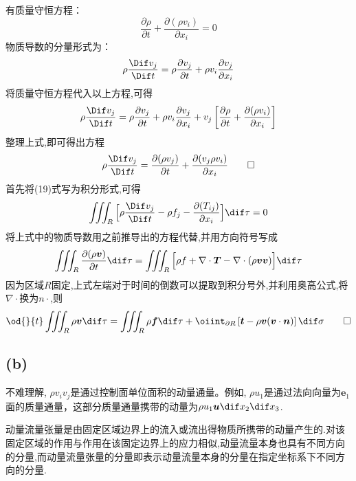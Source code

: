 \documentclass[12pt]{article}
\begin{document}
有质量守恒方程：
\begin{equation}
	\frac{\partial \rho}{\partial t} + \frac{\partial(\rho v_i)}{\partial x_i}=0
\end{equation}
物质导数的分量形式为：
\begin{equation}
	\rho\frac{\Dif  v_j}{\Dif t}=\rho\frac{\partial v_j}{\partial t} + \rho v_i\frac{\partial v_j}{\partial x_i}
\end{equation}
将质量守恒方程代入以上方程,可得
\begin{equation}
	\rho\frac{\Dif  v_j}{\Dif t}=\rho\frac{\partial v_j}{\partial t} + \rho v_i\frac{\partial v_j}{\partial x_i} + v_j \left[\frac{\partial \rho}{\partial t} + \frac{\partial(\rho v_i)}{\partial x_i}\right]
\end{equation}
整理上式,即可得出方程
\begin{equation}
	\rho\frac{\Dif  v_j}{\Dif t}=\frac{\partial(\rho v_j)}{\partial t}+\frac{\partial (v_j\rho v_i)}{\partial x_i}\qed
\end{equation}
首先将(19)式写为积分形式,可得
\begin{equation}
	\iiint_{R}\Big[\rho\frac{\Dif  v_j}{\Dif t} - \rho f_j - \frac{\partial(T_{ij})}{\partial x_i}\Big] \dif \tau = 0
\end{equation}
将上式中的物质导数用之前推导出的方程代替,并用方向符号写成
\begin{equation}
\iiint_{R} \frac{\partial (\rho \bm{v})}{\partial t} \dif \tau = \iiint_{R} \Big[\rho f + \nabla\cdot \bm{T} - \nabla\cdot(\rho \bm{v}\bm{v})\Big]\dif \tau
\end{equation}
因为区域$R$固定,上式左端对于时间的倒数可以提取到积分号外,并利用奥高公式,将$ \nabla\cdot$换为$ n\cdot$,则
\begin{equation}
	\od{}{t}\iiint_{R} \rho \bm{v} \dif \tau = \iiint_{R} \rho \bm{f} \dif \tau + \oiint_{\partial R} \left[ \bm{t} - \rho \bm{v}(\bm{v}\cdot \bm{n}) \right] \dif \sigma  \qed
\end{equation}

\subsection{(b)}

不难理解, $\rho v_iv_j$是通过控制面单位面积的动量通量。例如, $\rho u_1$是通过法向向量为$\bm{e}_1$面的质量通量，这部分质量通量携带的动量为$\rho u_1 \bm{u} \dif x_2 \dif x_3$.

动量流量张量是由固定区域边界上的流入或流出得物质所携带的动量产生的.对该固定区域的作用与作用在该固定边界上的应力相似,动量流量本身也具有不同方向的分量,而动量流量张量的分量即表示动量流量本身的分量在指定坐标系下不同方向的分量.
\end{document}

